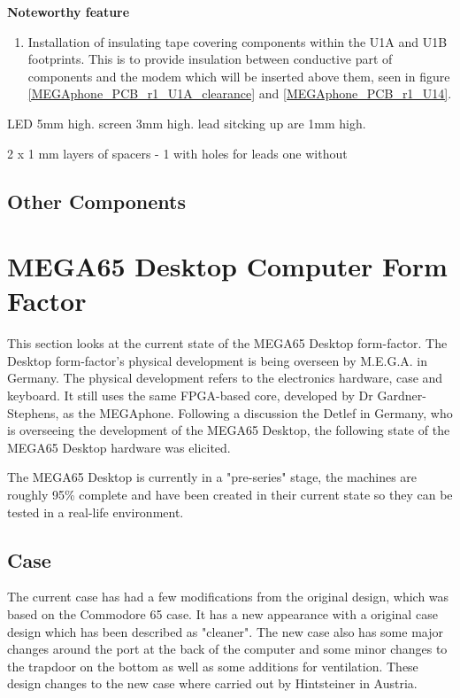 \textbf{Noteworthy feature}
\begin{enumerate}
\item Installation of insulating tape covering components within the U1A and U1B footprints. This is to provide insulation between conductive part of components and the modem which will be inserted above them, seen in figure \ref{MEGAphone_PCB_r1_U1A_clearance} and \ref{MEGAphone_PCB_r1_U14}. \\
\end{enumerate}

LED 5mm high. screen 3mm high. lead sitcking up are 1mm high.

2 x 1 mm layers of spacers - 1 with holes for leads one without

\subsection{Other Components}


\section{MEGA65 Desktop Computer Form Factor}
This section looks at the current state of the MEGA65 Desktop form-factor. The Desktop form-factor's physical development is being overseen by M.E.G.A. in Germany. The physical development refers to the electronics hardware, case and keyboard. It still uses the same FPGA-based core, developed by Dr Gardner-Stephens, as the MEGAphone. Following a discussion the Detlef in Germany, who is overseeing the development of the MEGA65 Desktop, the following state of the MEGA65 Desktop hardware was elicited. 

The MEGA65 Desktop is currently in a "pre-series" stage, the machines are roughly 95\% complete and have been created in their current state so they can be tested in a real-life environment. 

\subsection{Case}
The current case has had a few modifications from the original design, which was based on the Commodore 65 case. It has a new appearance with a original case design which has been described as "cleaner". The new case also has some major changes around the port at the back of the computer and some minor changes to the trapdoor on the bottom as well as some additions for ventilation. These design changes to the new case where carried out by Hintsteiner in Austria.

